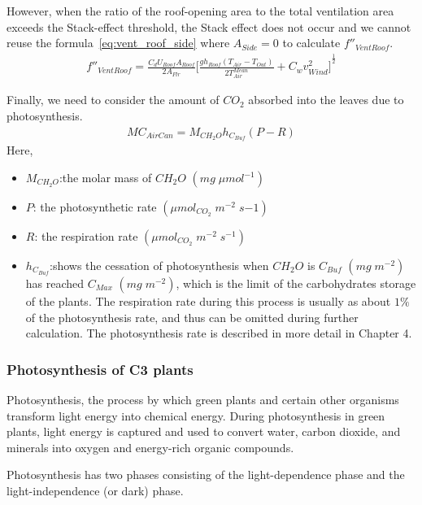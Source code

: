 \documentclass[a4paper]{article}
\numberwithin{equation}{section}
\begin{document}
However, when the ratio of the roof-opening area to the total ventilation area exceeds the Stack-effect threshold, the Stack effect does not occur and we cannot reuse the formula~\ref{eq:vent_roof_side} where \(A_{Side} = 0\) to
calculate \(f''_{VentRoof}\).
\begin{gather}
  f''_{VentRoof} = \frac{C_d U_{Roof} A_{Roof}}{2A_{Flr}} {\Big[\frac{gh_{Roof}(T_{Air} - T_{Out})}{2T^{Mean}_{Air}} + C_w v^2_{Wind} \Big]}^{ \frac{1}{2}}
\end{gather}

Finally, we need to consider the amount of \(CO_2\) absorbed into the leaves due to photosynthesis.
\begin{gather}
  MC_{AirCan} = M_{CH_2O} h_{C_{Buf}} (P - R)
\end{gather}
Here, 
\begin{itemize}
  \item  \( M_{CH_2O} \):the molar mass of \(CH_2O\) \((mg\;\mu mol^{-1})\)
  \item  \( P\): the photosynthetic rate \((\mu mol_{CO_2}\;m^{-2}\;s{-1})\)
  \item  \(R\):  the respiration rate \((\mu mol_{CO_2}\;m^{-2}\;s^{-1})\)
  \item  \( h_{C_{Buf}}\):shows the cessation of photosynthesis when \(CH_2O\) is \(C_{Buf}\) \((mg\;m^{-2})\) has reached \(C_{Max}\) \((mg\;m^{-2})\), which is the limit of the carbohydrates storage of the plants. The respiration rate during this process is usually as about \(1\%\) of the photosynthesis rate, and thus can be omitted during further calculation. The photosynthesis rate is described in more detail in Chapter 4.
 
\end{itemize}



\subsubsection{Photosynthesis of C3 plants}
\setcounter{equation}{19}
Photosynthesis, the process by which green plants and certain other organisms transform light energy into chemical energy. During photosynthesis in green plants, light energy is captured and used to convert water, carbon dioxide, and minerals into oxygen and energy-rich organic compounds.

Photosynthesis has two phases consisting of the light-dependence phase and the light-independence (or dark) phase.
\end{document}
